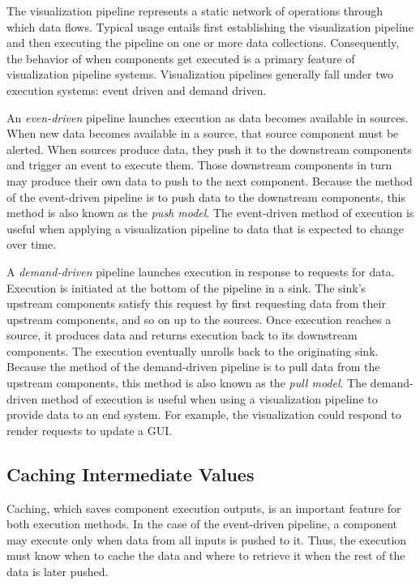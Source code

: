 \documentclass{article}
\newcommand*{\keyterm}[1]{\emph{#1}}
\begin{document}
The visualization pipeline represents a static network of operations
through which data flows.  Typical usage entails first establishing the
visualization pipeline and then executing the pipeline on one or more data
collections.  Consequently, the behavior of when components get executed is
a primary feature of visualization pipeline systems.  Visualization
pipelines generally fall under two execution systems: event driven and
demand driven.

An \keyterm{even-driven} pipeline launches execution as data becomes
available in sources.  When new data becomes available in a source, that
source component must be alerted.  When sources produce data, they push it
to the downstream components and trigger an event to execute them.  Those
downstream components in turn may produce their own data to push to the
next component.  Because the method of the event-driven pipeline is to push
data to the downstream components, this method is also known as the
\keyterm{push model}.  The event-driven method of execution is useful when
applying a visualization pipeline to data that is expected to change over
time.

A \keyterm{demand-driven} pipeline launches execution in response to
requests for data.  Execution is initiated at the bottom of the pipeline in
a sink.  The sink's upstream components satisfy this request by first
requesting data from their upstream components, and so on up to the
sources.  Once execution reaches a source, it produces data and returns
execution back to its downstream components.  The execution eventually
unrolls back to the originating sink.  Because the method of the
demand-driven pipeline is to pull data from the upstream components, this
method is also known as the \keyterm{pull model}.  The demand-driven method
of execution is useful when using a visualization pipeline to provide data
to an end system.  For example, the visualization could respond to render
requests to update a GUI.

\subsection{Caching Intermediate Values}
\label{sec:Caching}

Caching, which saves component execution outputs, is an important feature
for both execution methods.  In the case of the event-driven pipeline, a
component may execute only when data from all inputs is pushed to it.
Thus, the execution must know when to cache the data and where to retrieve
it when the rest of the data is later pushed.
\end{document}
